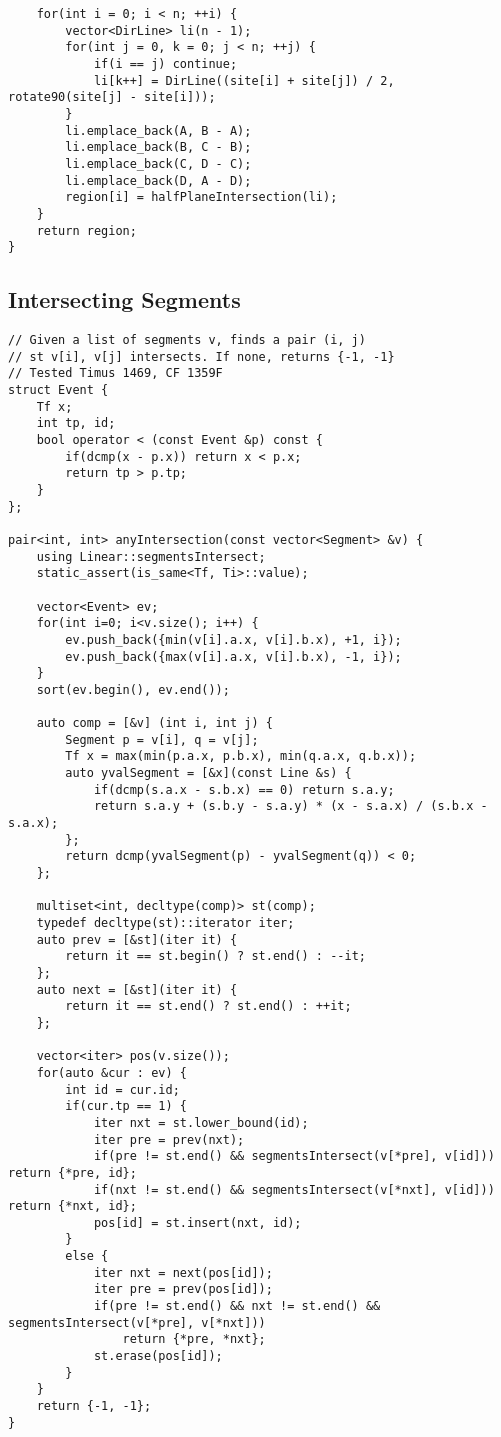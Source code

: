 \documentclass[FSZ,a4paper,onesided]{article}
\begin{document}
\begin{multicols*}{\COLS}
\begin{lstlisting}
    for(int i = 0; i < n; ++i) {
        vector<DirLine> li(n - 1);
        for(int j = 0, k = 0; j < n; ++j) {
            if(i == j) continue;
            li[k++] = DirLine((site[i] + site[j]) / 2, rotate90(site[j] - site[i]));
        }
        li.emplace_back(A, B - A);
        li.emplace_back(B, C - B);
        li.emplace_back(C, D - C);
        li.emplace_back(D, A - D);
        region[i] = halfPlaneIntersection(li);
    }
    return region;
}\end{lstlisting}
\subsection{Intersecting Segments}
\begin{lstlisting}
// Given a list of segments v, finds a pair (i, j)
// st v[i], v[j] intersects. If none, returns {-1, -1}
// Tested Timus 1469, CF 1359F
struct Event {
    Tf x;
    int tp, id;
    bool operator < (const Event &p) const {
        if(dcmp(x - p.x)) return x < p.x;
        return tp > p.tp;
    }
};

pair<int, int> anyIntersection(const vector<Segment> &v) {
    using Linear::segmentsIntersect;
    static_assert(is_same<Tf, Ti>::value);

    vector<Event> ev;
    for(int i=0; i<v.size(); i++) {
        ev.push_back({min(v[i].a.x, v[i].b.x), +1, i});
        ev.push_back({max(v[i].a.x, v[i].b.x), -1, i});
    }
    sort(ev.begin(), ev.end());

    auto comp = [&v] (int i, int j) {
        Segment p = v[i], q = v[j];
        Tf x = max(min(p.a.x, p.b.x), min(q.a.x, q.b.x));
        auto yvalSegment = [&x](const Line &s) {
            if(dcmp(s.a.x - s.b.x) == 0) return s.a.y;
            return s.a.y + (s.b.y - s.a.y) * (x - s.a.x) / (s.b.x - s.a.x);
        };
        return dcmp(yvalSegment(p) - yvalSegment(q)) < 0;
    };

    multiset<int, decltype(comp)> st(comp);
    typedef decltype(st)::iterator iter;
    auto prev = [&st](iter it) {
        return it == st.begin() ? st.end() : --it;
    };
    auto next = [&st](iter it) {
        return it == st.end() ? st.end() : ++it;
    };

    vector<iter> pos(v.size());
    for(auto &cur : ev) {
        int id = cur.id;
        if(cur.tp == 1) {
            iter nxt = st.lower_bound(id);
            iter pre = prev(nxt);
            if(pre != st.end() && segmentsIntersect(v[*pre], v[id]))   return {*pre, id};
            if(nxt != st.end() && segmentsIntersect(v[*nxt], v[id]))   return {*nxt, id};
            pos[id] = st.insert(nxt, id);
        }
        else {
            iter nxt = next(pos[id]);
            iter pre = prev(pos[id]);
            if(pre != st.end() && nxt != st.end() && segmentsIntersect(v[*pre], v[*nxt]))
                return {*pre, *nxt};
            st.erase(pos[id]);
        }
    }
    return {-1, -1};
}\end{lstlisting}

\end{multicols*}
\end{document}
